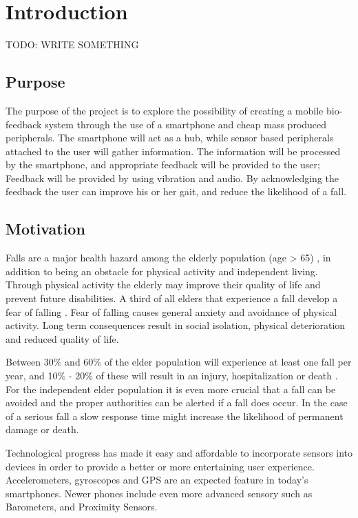 \chapter{Introduction}
TODO: WRITE SOMETHING

\section{Purpose}
The purpose of the project is to explore the possibility of creating a mobile bio-feedback system through the use of a smartphone and cheap mass produced peripherals. The smartphone will act as a hub, while sensor based peripherals attached to the user will gather information. The information will be processed by the smartphone, and appropriate feedback will be provided to the user; Feedback will be provided by using vibration and audio. By acknowledging the feedback the user can improve his or her gait, and reduce the likelihood of a fall.

\section{Motivation}
Falls are a major health hazard among the elderly population (age > 65) \cite{fallsHealthHazard}, in addition to being an obstacle for physical activity and independent living. Through physical activity the elderly may improve their quality of life and prevent future disabilities\cite{physicalActivity}. A third of all elders that experience a fall develop a fear of falling \cite{fearOfFalling}. Fear of falling causes general anxiety and avoidance of physical activity. Long term consequences result in social isolation, physical deterioration and reduced quality of life.\cite{physicalAvoidance} %

Between 30\% and 60\% of the elder population will experience at least one fall per year, and 10\% - 20\% of these will result in an injury, hospitalization or death \cite{fallStatistics}. For the independent elder population it is even more crucial that a fall can be avoided and the proper authorities can be alerted if a fall does occur. In the case of a serious fall a slow response time might increase the likelihood of permanent damage or death\cite{personHomeDeath, dangerousFallHome}.

Technological progress has made it easy and affordable to incorporate sensors into devices in order to provide a better or more entertaining user experience. Accelerometers, gyroscopes and GPS are an expected feature in today's smartphones. Newer phones include even more advanced sensory such as Barometers, and Proximity Sensors.

